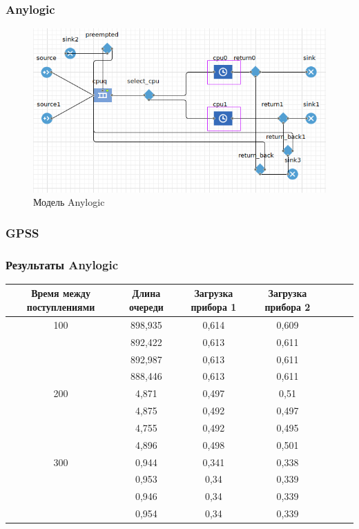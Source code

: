 \subsubsection{Anylogic}
\begin{figure}[h]
\centering
\includegraphics[resolution=96]{img/anylogic_model.png}
\caption{Модель Anylogic}
\end{figure}
\newpage
\subsubsection{GPSS}

\subsubsection{Результаты Anylogic}

\begin{tabular}{|c|c|c|c|c|c|c|}
\hline
Время между поступлениями & Длина очереди & Загрузка прибора 1 & Загрузка прибора 2 \\ \hline
100 & 898,935 & 0,614 & 0,609 \\ \hline
 & 892,422 & 0,613 & 0,611 \\ \hline
 & 892,987 & 0,613 & 0,611 \\ \hline
 & 888,446 & 0,613 & 0,611 \\ \hline
200 & 4,871 & 0,497 & 0,51 \\ \hline
 & 4,875 & 0,492 & 0,497  \\ \hline
 & 4,755 & 0,492 & 0,495 \\ \hline
 & 4,896 & 0,498 & 0,501  \\ \hline
300 & 0,944 & 0,341 & 0,338  \\ \hline
 & 0,953 & 0,34 & 0,339 \\ \hline
 & 0,946 & 0,34 & 0,339 \\ \hline
 & 0,954 & 0,34 & 0,339  \\ \hline
\end{tabular}
\\

